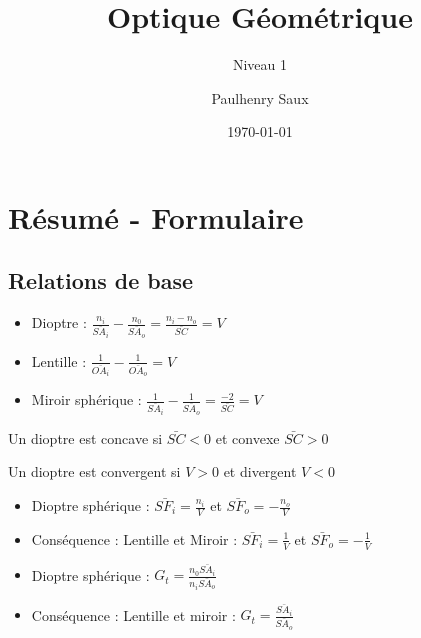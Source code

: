 \documentclass[french]{yLectureNote}
\title{Optique Géométrique}
\subtitle{Niveau 1}
\author{Paulhenry Saux}
\date{\today}
\begin{document}

\setcounter{chapter}{7}
\chapter{Résumé - Formulaire}
\section{Relations de base}
\begin{theorem}
 \begin{itemize}
  \item Dioptre : \(\displaystyle \frac{n_i}{\bar{SA_i}}-\frac{n_0}{\bar{SA_o}} = \frac{n_i-n_o}{\bar{SC}} = V\)
  \item Lentille : \(\displaystyle \frac{1}{\bar{OA_i}}-\frac{1}{\bar{OA_o}}  = V\)
  \item Miroir sphérique : \(\displaystyle \frac{1}{\bar{SA_i}}-\frac{1}{\bar{SA_o}}  = \frac{-2}{\bar{SC}} = V\)
 \end{itemize}
\end{theorem}
\begin{definition}
Un dioptre est concave si $\bar{SC}<0$ et convexe $\bar{SC}>0$
\end{definition}
\begin{definition}
Un dioptre est convergent si $V>0$ et divergent $V<0$
\end{definition}
\begin{theorem}
 \begin{itemize}
  \item Dioptre sphérique : \(\displaystyle\bar{SF_i} = \frac{n_i}{V}\) et \(\displaystyle\bar{SF_o} = -\frac{n_o}{V}\)
  \item Conséquence : Lentille et Miroir : \(\displaystyle\bar{SF_i} = \frac{1}{V}\) et \(\displaystyle\bar{SF_o} = -\frac{1}{V}\)
 \end{itemize}
\end{theorem}
\begin{theorem}
 \begin{itemize}
  \item Dioptre sphérique : \(\displaystyle G_t = \frac{n_0 \bar{SA_i}}{n_i \bar{SA_o}}\)
  \item Conséquence : Lentille  et miroir : \(\displaystyle G_t = \frac{ \bar{SA_i}}{\bar{SA_o}}\)
 \end{itemize}

\end{theorem}
\end{document}
